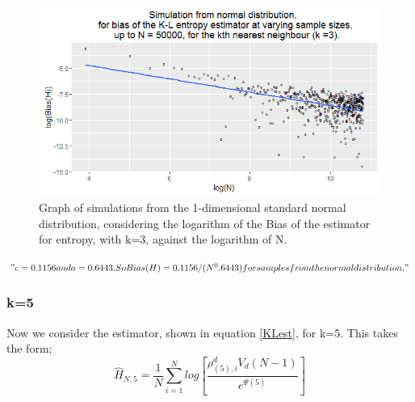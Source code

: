 \documentclass{article}
\begin{document}
\begin{figure}
  \begin{center}
    \includegraphics[width=\textwidth]{./Graphs/Normal_k=3_plot.png}
  \end{center}
  \caption{Graph of simulations from the 1-dimensional standard normal distribution, considering the logarithm of the Bias of the estimator for entropy, with k=3, against the logarithm of N.} 
  \label{normal_k=3_graph}
\end{figure}



$"c = 0.1156 and a = 0.6443. So Bias(H) = 0.1156/(N^0.6443)  for samples from the normal distribution."$


\subsubsection{k=5} \label{N_k=5}

Now we consider the estimator, shown in equation \ref{KLest}, for k=5. This takes the form;
\begin{equation}
\hat{H}_{N, 5} = \frac{1}{N} \sum_{i=1}^{N} log \left[ \frac{\rho_{(5),i}^{d} V_{d} (N-1)}{e^{\Psi(5)}} \right] \nonumber
\end{equation}
\end{document}
